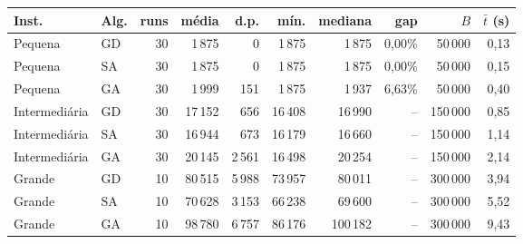 \begin{tabular}{llrrrrrrrr}
\toprule
Inst. & Alg. & runs & média & d.p. & mín. & mediana & gap & $B$ & $\bar t$ (s) \\
\midrule
Pequena & GD & 30 & 1\,875 & 0 & 1\,875 & 1\,875 & 0{,}00\% & 50\,000 & 0{,}13 \\
Pequena & SA & 30 & 1\,875 & 0 & 1\,875 & 1\,875 & 0{,}00\% & 50\,000 & 0{,}15 \\
Pequena & GA & 30 & 1\,999 & 151 & 1\,875 & 1\,937 & 6{,}63\% & 50\,000 & 0{,}40 \\
Intermediária & GD & 30 & 17\,152 & 656 & 16\,408 & 16\,990 & -- & 150\,000 & 0{,}85 \\
Intermediária & SA & 30 & 16\,944 & 673 & 16\,179 & 16\,660 & -- & 150\,000 & 1{,}14 \\
Intermediária & GA & 30 & 20\,145 & 2\,561 & 16\,498 & 20\,254 & -- & 150\,000 & 2{,}14 \\
Grande & GD & 10 & 80\,515 & 5\,988 & 73\,957 & 80\,011 & -- & 300\,000 & 3{,}94 \\
Grande & SA & 10 & 70\,628 & 3\,153 & 66\,238 & 69\,600 & -- & 300\,000 & 5{,}52 \\
Grande & GA & 10 & 98\,780 & 6\,757 & 86\,176 & 100\,182 & -- & 300\,000 & 9{,}43 \\
\bottomrule
\end{tabular}
